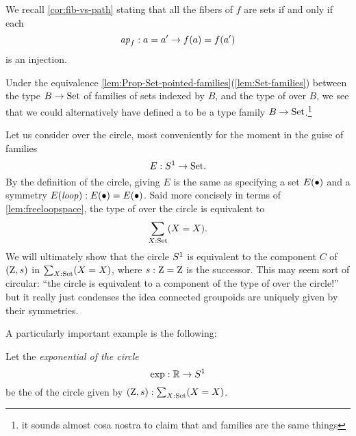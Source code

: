 \begin{remark}
  We recall \cref{cor:fib-vs-path} stating that all the fibers of $f$ 
are sets if and only if each 
$$\mathop{{\it ap}_{f}}: a=a'\to f(a)=f(a')$$ is an injection.
\end{remark}


\begin{remark}\label{rem:coveringsasfamilies}  
Under the equivalence \cref{lem:Prop-Set-pointed-families}(\ref{lem:Set-families})
between the type $B\to\mathord{\mathrm{Set}}$ of families of sets indexed by $B$, and the type
of \coverings over $B$, we see that we could alternatively have defined a \covering to be a type family $B\to\mathord{\mathrm{Set}}$.\footnote{it sounds almost cosa nostra to claim that \coverings and families are the same things}  
\end{remark}

\begin{remark}
  \label{xca:coveringsofS1}
  Let us consider \coverings over the circle, most conveniently for the moment in the guise of families 
$$E:S^1\to\mathord{\mathrm{Set}}.$$
By the definition of the circle, giving $E$ is the same as specifying a set $E(\bullet)$ and a symmetry $E(\mathit{loop}):E(\bullet)=E(\bullet)$.  Said more concisely in terms of \cref{lem:freeloopspace}, the type of \coverings over the circle is equivalent to 
$$\sum_{X:\mathord{\mathrm{Set}}}(X=X).$$
We will ultimately show that the circle $S^1$ is equivalent to the component $C$ of $(\mathrm{Z},s)$ in $\sum_{X:\mathord{\mathrm{Set}}}(X=X)$,  where $s:\mathrm{Z}=\mathrm{Z}$ is the successor.  This may seem sort of circular: ``the circle is equivalent to a component of the type of \coverings over the circle!'' but it really just condenses the idea connected groupoids are uniquely given by their symmetries.
\end{remark}
A particularly important example is the following:
\begin{definition}
  \label{def:RtoS1}
  Let the \emph{exponential \covering of the circle}
$$\exp:\mathbb R\to S^1$$ 
be the \covering of the circle given by $(\mathrm{Z},s):\sum_{X:\mathord{\mathrm{Set}}}(X=X)$.  
\end{definition}

